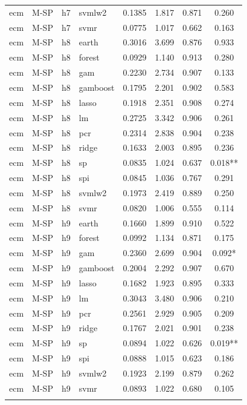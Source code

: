 \begin{ThreePartTable}
\begin{longtable}[t]{llclcccc}
ecm & M-SP & h7 & svmlw2 & 0.1385 & 1.817 & 0.871 & 0.260\\
ecm & M-SP & h7 & svmr & 0.0775 & 1.017 & 0.662 & 0.163\\
\addlinespace
ecm & M-SP & h8 & earth & 0.3016 & 3.699 & 0.876 & 0.933\\
ecm & M-SP & h8 & forest & 0.0929 & 1.140 & 0.913 & 0.280\\
ecm & M-SP & h8 & gam & 0.2230 & 2.734 & 0.907 & 0.133\\
ecm & M-SP & h8 & gamboost & 0.1795 & 2.201 & 0.902 & 0.583\\
ecm & M-SP & h8 & lasso & 0.1918 & 2.351 & 0.908 & 0.274\\
ecm & M-SP & h8 & lm & 0.2725 & 3.342 & 0.906 & 0.261\\
ecm & M-SP & h8 & pcr & 0.2314 & 2.838 & 0.904 & 0.238\\
ecm & M-SP & h8 & ridge & 0.1633 & 2.003 & 0.895 & 0.236\\
ecm & M-SP & h8 & sp & 0.0835 & 1.024 & 0.637 & 0.018**\\
ecm & M-SP & h8 & spi & 0.0845 & 1.036 & 0.767 & 0.291\\
ecm & M-SP & h8 & svmlw2 & 0.1973 & 2.419 & 0.889 & 0.250\\
ecm & M-SP & h8 & svmr & 0.0820 & 1.006 & 0.555 & 0.114\\
\addlinespace
ecm & M-SP & h9 & earth & 0.1660 & 1.899 & 0.910 & 0.522\\
ecm & M-SP & h9 & forest & 0.0992 & 1.134 & 0.871 & 0.175\\
ecm & M-SP & h9 & gam & 0.2360 & 2.699 & 0.904 & 0.092*\\
ecm & M-SP & h9 & gamboost & 0.2004 & 2.292 & 0.907 & 0.670\\
ecm & M-SP & h9 & lasso & 0.1682 & 1.923 & 0.895 & 0.333\\
ecm & M-SP & h9 & lm & 0.3043 & 3.480 & 0.906 & 0.210\\
ecm & M-SP & h9 & pcr & 0.2561 & 2.929 & 0.905 & 0.209\\
ecm & M-SP & h9 & ridge & 0.1767 & 2.021 & 0.901 & 0.238\\
ecm & M-SP & h9 & sp & 0.0894 & 1.022 & 0.626 & 0.019**\\
ecm & M-SP & h9 & spi & 0.0888 & 1.015 & 0.623 & 0.186\\
ecm & M-SP & h9 & svmlw2 & 0.1923 & 2.199 & 0.879 & 0.262\\
ecm & M-SP & h9 & svmr & 0.0893 & 1.022 & 0.680 & 0.105\\
\addlinespace

\end{longtable}
\end{ThreePartTable}
